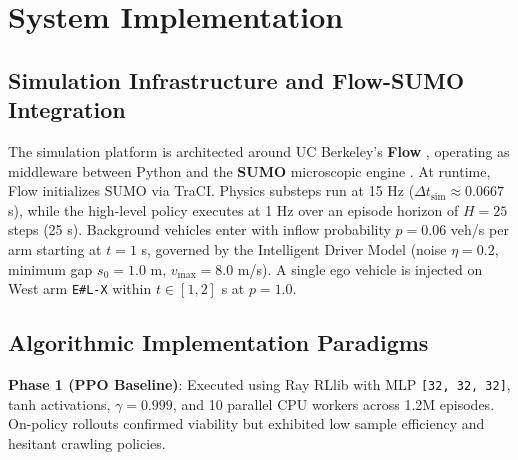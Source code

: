 \chapter{System Implementation}
\label{ch:implementation}

\section{Simulation Infrastructure and Flow-SUMO Integration}
The simulation platform is architected around UC Berkeley's \textbf{Flow} \cite{wu2017flow}, operating as middleware between Python and the \textbf{SUMO} microscopic engine \cite{krajzewicz2012recent}. At runtime, Flow initializes SUMO via TraCI. Physics substeps run at 15 Hz ($\Delta t_{\text{sim}} \approx 0.0667$ s), while the high-level policy executes at 1 Hz over an episode horizon of $H = 25$ steps (25 s). Background vehicles enter with inflow probability $p = 0.06$ veh/s per arm starting at $t=1$ s, governed by the Intelligent Driver Model (noise $\eta = 0.2$, minimum gap $s_0 = 1.0$ m, $v_{\text{max}} = 8.0$ m/s). A single ego vehicle is injected on West arm \texttt{E\#L-X} within $t \in [1, 2]$ s at $p = 1.0$.

\section{Algorithmic Implementation Paradigms}
\textbf{Phase 1 (PPO Baseline)}: Executed using Ray RLlib \cite{schulman2017proximal, liang2018ray} with MLP \texttt{[32, 32, 32]}, tanh activations, $\gamma = 0.999$, and 10 parallel CPU workers across 1.2M episodes. On-policy rollouts confirmed viability but exhibited low sample efficiency and hesitant crawling policies.

